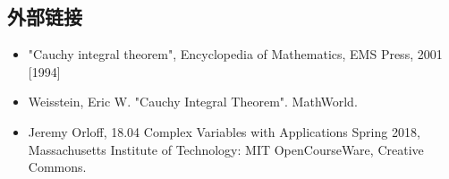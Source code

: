 \subsection{外部链接}
\begin{itemize}
\item "Cauchy integral theorem", Encyclopedia of Mathematics, EMS Press, 2001 [1994]
\item Weisstein, Eric W. "Cauchy Integral Theorem". MathWorld.
\item Jeremy Orloff, 18.04 Complex Variables with Applications Spring 2018, Massachusetts Institute of Technology: MIT OpenCourseWare, Creative Commons.
\end{itemize}
